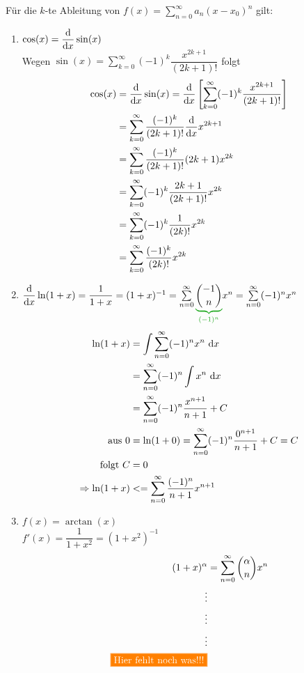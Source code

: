 \Bem Für die $k$-te Ableitung von $f(x)=\sum\limits_{n=0}^{\infty}a_n(x-x_0)^n$ gilt:

\Bsp
\begin{enumerate}
	\item $\cos(x)=\dfrac{\mathrm{d}}{\mathrm{d}x}\sin(x)$\\
	Wegen $\sin(x)=\sum\limits_{k=0}^{\infty}(-1)^k\dfrac{x^{2k+1}}{(2k+1)!}$ folgt
	\begin{align*}
	\cos(x)&=\dfrac{\mathrm{d}}{\mathrm{d}x}\sin(x)=\dfrac{\mathrm{d}}{\mathrm{d}x}\left[\sum\limits_{k=0}^{\infty}(-1)^k\dfrac{x^{2k+1}}{(2k+1)!}\right]\\
	&=\sum\limits_{k=0}^{\infty}\dfrac{(-1)^k}{(2k+1)!}\dfrac{\mathrm{d}}{\mathrm{d}x}x^{2k+1}\\
	&=\sum\limits_{k=0}^{\infty}\dfrac{(-1)^k}{(2k+1)!}(2k+1)x^{2k}\\
	&=\sum\limits_{k=0}^{\infty}(-1)^k\dfrac{2k+1}{(2k+1)!}x^{2k}\\
	&=\sum\limits_{k=0}^{\infty}(-1)^k\dfrac{1}{(2k)!}x^{2k}\\
	&=\sum\limits_{k=0}^{\infty}\dfrac{(-1)^k}{(2k)!}x^{2k}
	\end{align*}
	
	\item $\df{}{x}\ln(1+x)=\dfrac{1}{1+x}=(1+x)^{-1}=\sum\limits_{n=0}^{\infty}\greenunderbrace{\binom{-1}{n}}{(-1)^n}x^n=\sum\limits_{n=0}^{\infty}(-1)^nx^n$
	\begin{align*}
	\ln(1+x)&=\int\sum\limits_{n=0}^{\infty}(-1)^nx^n\ \mathrm{d}x\\
	&=\sum\limits_{n=0}^{\infty}(-1)^n\int x^n\ \mathrm{d}x\\
	&=\sum\limits_{n=0}^{\infty}(-1)^n\dfrac{x^{n+1}}{n+1}+C\\
	\text{aus }0&=\ln(1+0)=\sum\limits_{n=0}^{\infty}(-1)^n\dfrac{0^{n+1}}{n+1}+C=C\\
	\text{folgt }C&=0\\
	\Rightarrow \ln(1+x)&<=\sum\limits_{n=0}^{\infty}\dfrac{(-1)^n}{n+1}x^{n+1}
	\end{align*}
	
	\item $f(x)=\arctan(x)$\\
	$f'(x)=\dfrac{1}{1+x^2}=(1+x^2)^{-1}$
	\begin{align*}
	(1+x)^\alpha&=\sum\limits_{n=0}^{\infty}\binom{\alpha}{n}x^n\\
	\vdots\\
	\vdots\\
	\vdots\\
	\placeholder
	\end{align*}
\end{enumerate}

